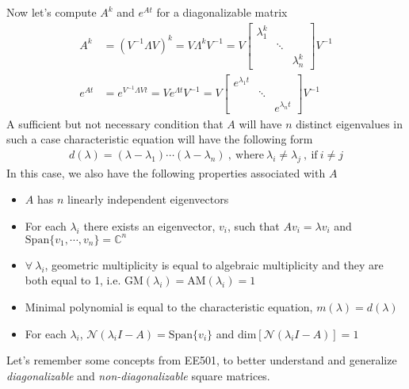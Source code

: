 \documentclass[twoside]{article}
\begin{document}
Now let's compute $A^k$ and $e^{At}$ for a diagonalizable matrix 
%
\begin{align*}
A^k &= \left(V^{-1} \Lambda V \right)^k  = V \Lambda^k V^{-1} = V \left[ \begin{array}{ccc} \lambda_1^k &  &   \\   &  \ddots & \\ & & \lambda_n^k \end{array} \right] V^{-1}
\\
e^{A t} &= e^{V^{-1} \Lambda V t}  = V e^{ \Lambda t} V^{-1} = V \left[ \begin{array}{ccc} e^{\lambda_1 t} &  &   \\   &  \ddots & \\ & & e^{\lambda_n t} \end{array} \right] V^{-1}  
\end{align*}
%
A sufficient but not necessary condition that $A$ will have $n$ distinct eigenvalues in such a case characteristic equation will have the following form
%
\begin{align*}
d(\lambda) = (\lambda - \lambda_1) \cdots (\lambda - \lambda_n) \ , \ \mathrm{where} \ \lambda_i \neq \lambda_j \ , \ \mathrm{if} \ i \neq j 
\end{align*}
% 
In this case, we also have the following properties associated with $A$
%
\begin{itemize}
	\item $A$ has $n$ linearly independent eigenvectors
	\item For each $\lambda_i$ there exists an eigenvector, $v_i$, such that $A v_i = \lambda v_i$ and $\mathrm{Span}\lbrace v_1 , \cdots , v_n \rbrace = \mathbb{C}^n$
	\item $\forall \ \lambda_i$, geometric multiplicity is equal to algebraic multiplicity and they are both equal to 1, i.e. $\mathrm{GM}(\lambda_i) = \mathrm{AM}(\lambda_i) = 1$
	\item Minimal polynomial is equal to the characteristic equation, $m(\lambda) = d(\lambda)$
	\item For each $\lambda_i$, $\mathcal{N}(\lambda_i I - A) = \mathrm{Span} \lbrace v_i \rbrace $ and $ \mathrm{dim} [ \mathcal{N}(\lambda_i I - A) ] = 1$
\end{itemize}
%
Let's remember some concepts from EE501, to better understand and generalize \textit{diagonalizable} and \textit{non-diagonalizable} square matrices.  
\end{document}

